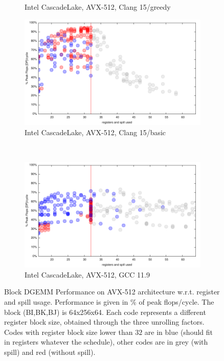 \documentclass{article}
\begin{document}
\begin{figure}[h!]
\begin{subfigure}[h!]{0.45\textwidth}
  \caption{Intel CascadeLake, AVX-512, Clang 15/greedy}
  \end{subfigure}
  \begin{subfigure}[h!]{0.45\textwidth}  
\includegraphics[width=\textwidth]{../benches/gemm/cascadelake-64x256x64/basic.pdf}
  \caption{Intel CascadeLake, AVX-512, Clang 15/basic}
  \end{subfigure}\\
  \begin{subfigure}[h!]{0.45\textwidth}  
\includegraphics[width=\textwidth]{../benches/gemm/cascadelake-64x256x64/gcc-11.9.pdf}
  \caption{Intel CascadeLake, AVX-512, GCC 11.9}
  \end{subfigure}
  \caption{Block DGEMM Performance on AVX-512 architecture w.r.t. register and spill usage. Performance is given in \% of peak flops/cycle. The block (BI,BK,BJ) is 64x256x64. Each code represents a different register block size, obtained through the three unrolling factors. Codes with register block size lower than $32$ are in blue (should fit in registers whatever the schedule), other codes are in grey (with spill) and red (without spill).  \label{fig:cascadelake}}
\end{figure}
\end{document}
